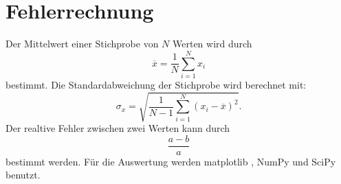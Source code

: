 \section{Fehlerrechnung}

Der Mittelwert einer Stichprobe von $N$ Werten wird durch
\begin{equation*}
    \overline{x} = \frac{1}{N} \sum_{i=1}^N x_i
    \label{eqn:mittelwert}
\end{equation*}
bestimmt.
\newline
Die Standardabweichung der Stichprobe wird berechnet mit:
\begin{equation*}
    \sigma_x = \sqrt{\frac{1}{N-1} \sum_{i=1}^N (x_i - \overline{x})^2}.
    \label{eqn:standard}
\end{equation*}
\newline
Der realtive Fehler zwischen zwei Werten kann durch
\begin{equation*}
    \frac{a-b}{a}
\end{equation*}
bestimmt werden.
\newline
Für die Auswertung werden matplotlib \cite{matplotlib}, NumPy \cite{numpy} und SciPy \cite{scipy} benutzt.